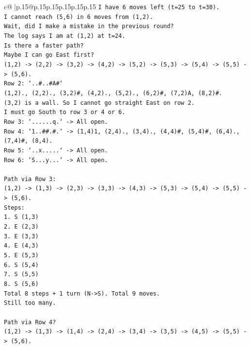 \documentclass{article}
\begin{document}
{\begin{supertabular}{c@{$\;$}|p{.15\linewidth}@{}p{.15\linewidth}p{.15\linewidth}p{.15\linewidth}p{.15\linewidth}p{.15\linewidth}}
{{{\texttt{I have 6 moves left (t=25 to t=30).} \\
\texttt{I cannot reach (5,6) in 6 moves from (1,2).} \\
\texttt{Wait, did I make a mistake in the previous round?} \\
\texttt{The log says I am at (1,2) at t=24.} \\
\texttt{Is there a faster path?} \\
\texttt{Maybe I can go East first?} \\
\texttt{(1,2) {-}> (2,2) {-}> (3,2) {-}> (4,2) {-}> (5,2) {-}> (5,3) {-}> (5,4) {-}> (5,5) {-}> (5,6).} \\
\texttt{Row 2: `..\#..\#A\#`} \\
\texttt{(1,2)., (2,2)., (3,2)\#, (4,2)., (5,2)., (6,2)\#, (7,2)A, (8,2)\#.} \\
\texttt{(3,2) is a wall. So I cannot go straight East on row 2.} \\
\texttt{I must go South to row 3 or 4 or 6.} \\
\texttt{Row 3: `......q.` {-}> All open.} \\
\texttt{Row 4: `1..\#\#.\#.` {-}> (1,4)1, (2,4)., (3,4)., (4,4)\#, (5,4)\#, (6,4)., (7,4)\#, (8,4).} \\
\texttt{Row 5: `..x.....` {-}> All open.} \\
\texttt{Row 6: `S...y...` {-}> All open.} \\
\\ 
\texttt{Path via Row 3:} \\
\texttt{(1,2) {-}> (1,3) {-}> (2,3) {-}> (3,3) {-}> (4,3) {-}> (5,3) {-}> (5,4) {-}> (5,5) {-}> (5,6).} \\
\texttt{Steps:} \\
\texttt{1. S (1,3)} \\
\texttt{2. E (2,3)} \\
\texttt{3. E (3,3)} \\
\texttt{4. E (4,3)} \\
\texttt{5. E (5,3)} \\
\texttt{6. S (5,4)} \\
\texttt{7. S (5,5)} \\
\texttt{8. S (5,6)} \\
\texttt{Total 8 steps + 1 turn (N{-}>S). Total 9 moves.} \\
\texttt{Still too many.} \\
\\ 
\texttt{Path via Row 4?} \\
\texttt{(1,2) {-}> (1,3) {-}> (1,4) {-}> (2,4) {-}> (3,4) {-}> (3,5) {-}> (4,5) {-}> (5,5) {-}> (5,6).} \\
}}}
\end{supertabular}}
\end{document}

